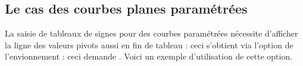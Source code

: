 \documentclass{tutodoc}
\begin{document}

\subsection{Le cas des courbes planes paramétrées}

La saisie de tableaux de signes pour des courbes paramétrées nécessite d'afficher la ligne des valeurs pivots aussi en fin de tableau : ceci s'obtient via l'option  de l'envionnement  : ceci demande . Voici un exemple d'utilisation de cette option. 
\end{document}
